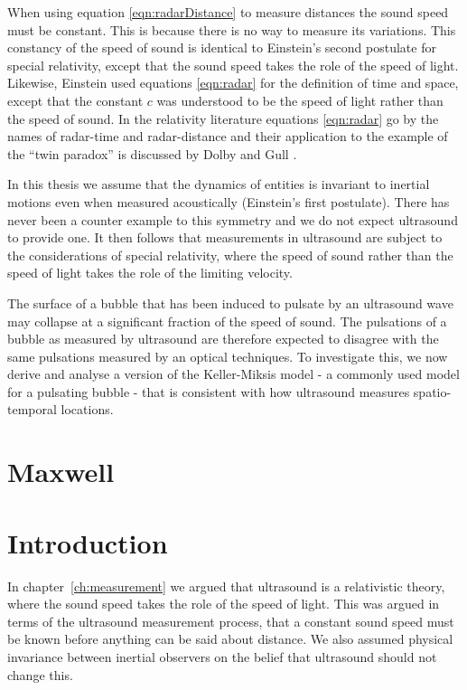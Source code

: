 \documentclass[10pt, fleqn,draft,showtrims,oldfontcommands]{article} %
\newcommand{\eqnref}[1]{\ref{eqn:#1}}
\newcommand{\chapref}[1]{chapter~\ref{ch:#1}}
\begin{document}
When using equation \eqnref{radarDistance} to measure distances the sound speed must be constant.
This is because there is no way to measure its variations.
This constancy of the speed of sound is identical to Einstein's  second postulate for special relativity\cite{Einstein1905},
except that the sound speed takes the role of the speed of light.
Likewise, Einstein used equations \eqnref{radar} for the definition of time and space, 
except that  the  constant $c$ was understood to be the speed of light rather than the speed of sound.
In the relativity literature equations \eqnref{radar} go by the names of radar-time 
and radar-distance and their application to the example of the ``twin paradox'' is discussed by Dolby and Gull  \cite{Dolby2001}.

In this thesis we  assume that the dynamics of entities is invariant to inertial motions even when measured acoustically (Einstein's first postulate).
There has never been a counter example to this symmetry and we do not expect ultrasound to provide one.
It then follows that measurements in ultrasound are subject to the considerations of special relativity,
where the speed of sound rather than the speed of light takes the role of the limiting velocity.

The surface of a  bubble that has been induced to pulsate by an ultrasound wave may collapse at a significant fraction of the speed of sound\cite{Neppiras1980}.
The pulsations of a bubble as measured by ultrasound are therefore expected to disagree with the same pulsations measured by an optical techniques.
To investigate this, we now derive and analyse a version of the Keller-Miksis model\cite{Keller1980} 
- a commonly used model for a pulsating bubble - that is consistent with how ultrasound measures spatio-temporal locations.


\section{Maxwell}\label{sec:Maxwell}


\section{Introduction}

In \chapref{measurement} we argued that ultrasound is a relativistic theory,
where the sound speed takes the role of the speed of light.
This was argued in terms of the  ultrasound measurement process,
that a constant sound speed must be known before anything can be said about distance.
We also assumed  physical invariance between inertial observers
on the belief that ultrasound should not change this.
\end{document}
